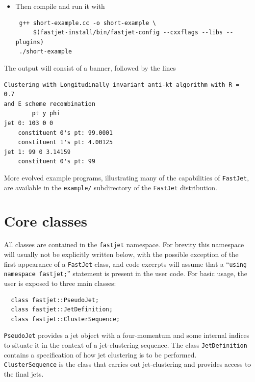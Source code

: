\documentclass[12pt,a4]{article}
\newcommand{\fastjet}{\texttt{FastJet}\xspace}
\newcommand{\ttt}[1]{{\small\texttt{#1}}}
\begin{document}
\begin{itemize}
\begin{lstlisting}
  // print out some info
  cout << "Clustered with " << jet_def.description() << endl;

  // print the jets
  cout <<   "        pt y phi" << endl;
  for (unsigned i = 0; i < jets.size(); i++) {
    cout << "jet " << i << ": "<< jets[i].pt() << " " 
                   << jets[i].rap() << " " << jets[i].phi() << endl;
    vector<PseudoJet> constituents = jets[i].constituents();
    for (unsigned j = 0; j < constituents.size(); j++) {
      cout << "    constituent " << j << "'s pt: "<< constituents[j].pt() << endl;
    }
  }
}
\end{lstlisting}

\item \rm Then compile and run it with
\begin{verbatim}
 g++ short-example.cc -o short-example \
     $(fastjet-install/bin/fastjet-config --cxxflags --libs --plugins)
 ./short-example
\end{verbatim}
\end{itemize}
\noindent
The output will consist of a banner, followed by the lines
\begin{verbatim}
Clustering with Longitudinally invariant anti-kt algorithm with R = 0.7 
and E scheme recombination
        pt y phi
jet 0: 103 0 0
    constituent 0's pt: 99.0001
    constituent 1's pt: 4.00125
jet 1: 99 0 3.14159
    constituent 0's pt: 99
\end{verbatim}

More evolved example programs, illustrating many of the capabilities of \fastjet,
are available in the \ttt{example/} subdirectory of the
\fastjet distribution.

\section{Core classes}
\label{sec:core-classes}

All classes are contained in the \ttt{fastjet} namespace. For brevity this namespace
will usually not be explicitly written below, with the possible exception of the first
appearance of a \fastjet class, and code excerpts will
assume that a ``\ttt{using namespace fastjet;}'' statement is present in the user
code.
For basic
usage, the user is exposed to three main classes:
\begin{lstlisting}
  class fastjet::PseudoJet;
  class fastjet::JetDefinition;
  class fastjet::ClusterSequence;
\end{lstlisting}
\ttt{PseudoJet} provides a jet object with a four-momentum and some
internal indices to situate it in the context of a jet-clustering
sequence. 
%
The class \ttt{JetDefinition} contains a specification of how
jet clustering is to be performed. 
%
\ttt{ClusterSequence} is the class that carries out
jet-clustering and provides access to the final jets.
\end{document}
